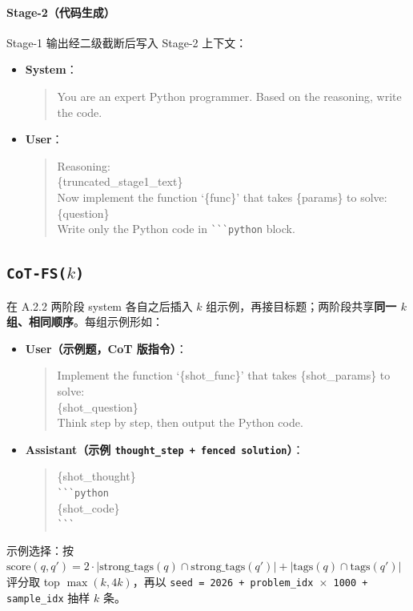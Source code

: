 \documentclass[
    decl-page,  %
  ]{njuthesis}
\begin{document}
\paragraph{Stage-2（代码生成）}
Stage-1 输出经二级截断后写入 Stage-2 上下文：
\begin{itemize}
    \item \textbf{System}：
\begin{quote}\ttfamily\footnotesize
You are an expert Python programmer. Based on the reasoning, write the code.
\end{quote}
    \item \textbf{User}：
\begin{quote}\ttfamily\footnotesize
Reasoning:\\[0.2em]
\{truncated\_stage1\_text\}\\[0.5em]
Now implement the function `\{func\}' that takes \{params\} to solve:\\[0.3em]
\{question\}\\[0.3em]
Write only the Python code in \verb|```python| block.
\end{quote}
\end{itemize}

\subsection{\texttt{CoT-FS($k$)}}
在 A.2.2 两阶段 system 各自之后插入 $k$ 组示例，再接目标题；两阶段共享\textbf{同一 $k$ 组、相同顺序}。每组示例形如：
\begin{itemize}
    \item \textbf{User（示例题，CoT 版指令）}：
\begin{quote}\ttfamily\footnotesize
Implement the function `\{shot\_func\}' that takes \{shot\_params\} to solve:\\[0.3em]
\{shot\_question\}\\[0.3em]
Think step by step, then output the Python code.
\end{quote}
    \item \textbf{Assistant（示例 \texttt{thought\_step + fenced solution}）}：
\begin{quote}\ttfamily\footnotesize
\{shot\_thought\}\\[0.5em]
\verb|```python|\\
\{shot\_code\}\\
\verb|```|
\end{quote}
\end{itemize}
示例选择：按 $\mathrm{score}(q, q') = 2 \cdot |\mathrm{strong\_tags}(q) \cap \mathrm{strong\_tags}(q')| + |\mathrm{tags}(q) \cap \mathrm{tags}(q')|$ 评分取 top $\max(k, 4k)$，再以 \texttt{seed = 2026 + problem\_idx \(\times\) 1000 + sample\_idx} 抽样 $k$ 条。
\end{document}

